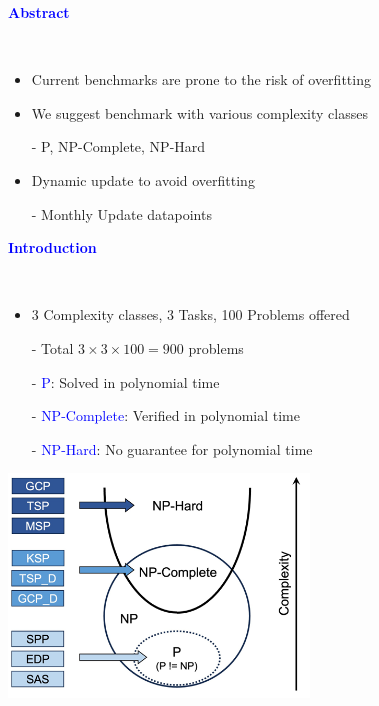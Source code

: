 \documentclass[professionalfont]{beamer}
\begin{document}
\frame{\titlepage}


\begin{frame}
\begin{center}
    { \textbf{\textcolor{blue}{ {\fontsize{12}{14}\selectfont Abstract} }} }
\end{center}
\\[0.5cm]

{\fontsize{10}{14}\selectfont 
\begin{itemize}
    \item Current benchmarks are prone to the risk of overfitting
    \item We suggest benchmark with various complexity classes
    
    - P, NP-Complete, NP-Hard
    
    \item Dynamic update to avoid overfitting
    
    - Monthly Update datapoints
\end{itemize}
}

\end{frame}

\begin{frame}
\begin{center}
    { \textbf{\textcolor{blue}{ {\fontsize{12}{14}\selectfont Introduction} }} }
\end{center}
\\[0.2cm]

{\fontsize{10}{14}\selectfont 
\begin{itemize}
    \item 3 Complexity classes, 3 Tasks, 100 Problems offered
    
    - Total \( 3\times3\times100=900 \) problems
    
    - {\textcolor{blue}{P}}: Solved in polynomial time
    
    - {\textcolor{blue}{NP-Complete}}: Verified in polynomial time

    - {\textcolor{blue}{NP-Hard}}: No guarantee for polynomial time
\end{itemize}
}

\begin{center}
    \includegraphics[width=0.6\textwidth]{figure1.png}
\end{center}

\end{frame}
\end{document}
